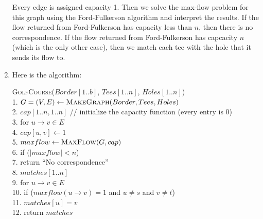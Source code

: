 \documentclass{article}
\begin{document}
\begin{enumerate}
    Every edge is assigned capacity 1. \parspace
    Then we solve the max-flow problem for this graph using the Ford-Fulkerson algorithm and interpret the results.
    If the flow returned from Ford-Fulkerson has capacity less than $n$, then there is no correspondence.
    If the flow returned from Ford-Fulkerson has capcacity $n$ (which is the only other case), then we match each tee with the hole that it sends its flow to.
    \item Here is the algorithm:
    \begin{algorithm}
        \textsc{GolfCourse}($Border[1..b]$, $Tees[1..n]$, $Holes[1..n]$) \\
        1. \hspace{1em} $G = (V,E) \gets \textsc{MakeGraph}(Border, Tees, Holes)$ \\
        2. \hspace{1em} $cap[1..n, 1..n]$   // initialize the capacity function (every entry is 0) \\
        3. \hspace{1em} for $u \to v \in E$ \\
        4. \hspace{2em}     $cap[u,v] \gets 1$ \\
        5. \hspace{1em} $maxflow \gets \textsc{MaxFlow}(G, cap)$ \\
        6. \hspace{1em} if ($|maxflow| < n$) \\
        7. \hspace{2em}     return ``No correspondence'' \\
        8. \hspace{1em} $matches[1..n]$ \\
        9. \hspace{1em} for $u \to v \in E$ \\
        10. \hspace{1.6em} if ($maxflow(u \to v) = 1$ and $u \neq s$ and $v \neq t$) \\
        11. \hspace{2.6em}     $matches[u] = v$ \\
        12. \hspace{0.6em} return $matches$ \\\\


\end{algorithm}
\end{enumerate}
\end{document}
